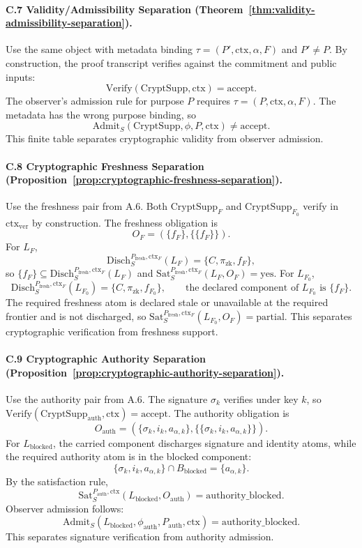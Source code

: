 \documentclass[11pt,twoside]{article}
\theoremstyle{definition}
\newcommand{\CryptSupp}{\mathrm{CryptSupp}}
\newcommand{\Sat}{\mathrm{Sat}}
\newcommand{\Admit}{\mathrm{Admit}}
\newcommand{\Disch}{\mathrm{Disch}}
\newcommand{\Verify}{\mathrm{Verify}}
\newcommand{\ctx}{\mathrm{ctx}}
\newcommand{\fresh}{\mathrm{fresh}}
\newcommand{\authorityblocked}{\mathrm{authority\_blocked}}
\begin{document}
\paragraph{C.7 Validity/Admissibility Separation (Theorem~\ref{thm:validity-admissibility-separation}).}
Use the same object with metadata binding $\tau=(P',\ctx,\alpha,F)$ and
$P'\neq P$. By construction, the proof transcript verifies against the
commitment and public inputs:
\[
  \Verify(\CryptSupp,\ctx)=\mathrm{accept}.
\]
The observer's admission rule for purpose $P$ requires
$\tau=(P,\ctx,\alpha,F)$. The metadata has the wrong purpose binding, so
\[
  \Admit_S(\CryptSupp,\phi,P,\ctx)\neq\mathrm{accept}.
\]
This finite table separates cryptographic validity from observer admission.

\paragraph{C.8 Cryptographic Freshness Separation (Proposition~\ref{prop:cryptographic-freshness-separation}).}
Use the freshness pair from A.6. Both $\CryptSupp_F$ and
$\CryptSupp_{F_0}$ verify in $\ctx_{\mathrm{ver}}$ by construction. The
freshness obligation is
\[
  O_F=(\{f_F\},\{\{f_F\}\}).
\]
For $L_F$,
\[
  \Disch_S^{P_{\fresh},\ctx_F}(L_F)=\{C,\pi_{\mathrm{zk}},f_F\},
\]
so $\{f_F\}\subseteq\Disch_S^{P_{\fresh},\ctx_F}(L_F)$ and
$\Sat_S^{P_{\fresh},\ctx_F}(L_F,O_F)=\mathrm{yes}$. For $L_{F_0}$,
\[
  \Disch_S^{P_{\fresh},\ctx_F}(L_{F_0})=\{C,\pi_{\mathrm{zk}},f_{F_0}\},
  \qquad
  \text{the declared component of }L_{F_0}\text{ is }\{f_F\}.
\]
The required freshness atom is declared stale or unavailable at the required
frontier and is not discharged, so
$\Sat_S^{P_{\fresh},\ctx_F}(L_{F_0},O_F)=\mathrm{partial}$. This separates
cryptographic verification from freshness support.

\paragraph{C.9 Cryptographic Authority Separation (Proposition~\ref{prop:cryptographic-authority-separation}).}
Use the authority pair from A.6. The signature $\sigma_k$ verifies under key
$k$, so $\Verify(\CryptSupp_{\mathrm{auth}},\ctx)=\mathrm{accept}$. The authority
obligation is
\[
  O_{\mathrm{auth}}
  =
  (\{\sigma_k,i_k,a_{\alpha,k}\},
   \{\{\sigma_k,i_k,a_{\alpha,k}\}\}).
\]
For $L_{\mathrm{blocked}}$, the carried component discharges signature and
identity atoms, while the required authority atom is in the blocked component:
\[
  \{\sigma_k,i_k,a_{\alpha,k}\}\cap B_{\mathrm{blocked}}
  =
  \{a_{\alpha,k}\}.
\]
By the satisfaction rule,
\[
  \Sat_S^{P_{\mathrm{auth}},\ctx}(L_{\mathrm{blocked}},O_{\mathrm{auth}})
  =
  \authorityblocked.
\]
Observer admission follows:
\[
  \Admit_S(L_{\mathrm{blocked}},\phi_{\mathrm{auth}},P_{\mathrm{auth}},\ctx)
  =
  \authorityblocked.
\]
This separates signature verification from authority admission.
\end{document}
